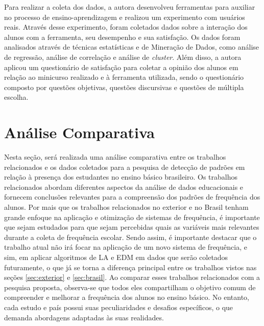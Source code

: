 Para realizar a coleta dos dados, a autora desenvolveu ferramentas para auxiliar no processo de ensino-aprendizagem e realizou um experimento com usuários reais. Através desse experimento, foram coletados dados sobre a interação dos alunos com a ferramenta, seu desempenho e sua satisfação. Os dados foram analisados através de técnicas estatísticas e de Mineração de Dados, como análise de regressão, análise de correlação e análise de \textit{cluster}. Além disso, a autora aplicou um questionário de satisfação para coletar a opinião dos alunos em relação ao minicurso realizado e à ferramenta utilizada, sendo o questionário composto por questões objetivas, questões discursivas e questões de múltipla escolha.





\section{Análise Comparativa}


Nesta seção, será realizada uma análise comparativa entre os trabalhos relacionados e os dados coletados para a pesquisa de detecção de padrões em relação à presença dos estudantes no ensino básico brasileiro. Os trabalhos relacionados abordam diferentes aspectos da análise de dados educacionais e fornecem conclusões relevantes para a compreensão dos padrões de frequência dos alunos. Por mais que os trabalhos relacionados no exterior e no Brasil tenham grande enfoque na aplicação e otimização de sistemas de frequência, é importante que sejam estudados para que sejam percebidas quais as variáveis mais relevantes durante a coleta de frequência escolar. Sendo assim, é importante destacar que o trabalho atual não irá focar na aplicação de um novo sistema de frequência, e sim, em aplicar algoritmos de LA e EDM em dados que serão coletados futuramente, o que já se torna a diferença principal entre os trabalhos vistos nas seções \ref{sec:exterior} e \ref{sec:brasil}. Ao comparar esses trabalhos relacionados com a pesquisa proposta, observa-se que todos eles compartilham o objetivo comum de compreender e melhorar a frequência dos alunos no ensino básico. No entanto, cada estudo e país possui suas peculiaridades e desafios específicos, o que demanda abordagens adaptadas às suas realidades.

